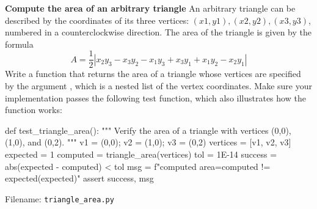 \begin{Problem}{\textbf{Compute the area of an arbitrary triangle}} \label{triangle}
An arbitrary triangle can be described by the coordinates of its three vertices: $(x1, y1), (x2, y2), (x3, y3)$, numbered in a counterclockwise direction. The area of the triangle is given by the formula
\[
A = \frac{1}{2}|x_2y_3-x_3y_2-x_1y_3 + x_3y_1 + x_1y_2 - x_2y_1 |
\]
Write a function  that returns 
the area of a triangle whose vertices are specified by the argument , which is a nested list of the vertex coordinates. Make sure your implementation passes the following test function, which also illustrates how the  function works:
\begin{python}
def test_triangle_area():
    """
    Verify the area of a triangle with vertices 
    (0,0), (1,0), and (0,2).
    """
    v1 = (0,0);  v2 = (1,0);  v3 = (0,2)
    vertices = [v1, v2, v3]
    expected = 1
    computed = triangle_area(vertices)
    tol = 1E-14
    success = abs(expected - computed) < tol
    msg = f"computed area={computed} != {expected}(expected)" 
    assert success, msg
\end{python}

Filename: \texttt{triangle\_area.py}
\end{Problem}



